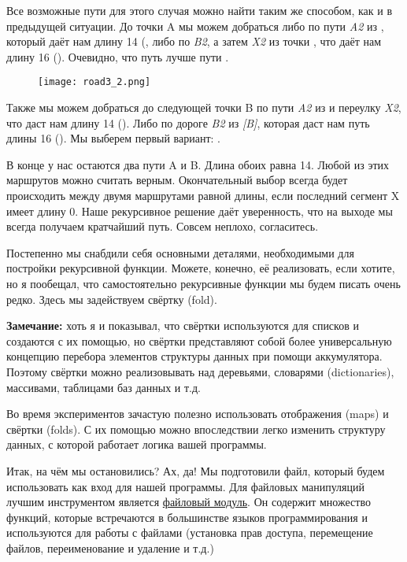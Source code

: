 Все возможные пути для этого случая можно найти таким же способом, как и в предыдущей ситуации.
До точки A мы можем добраться либо по пути \emph{A2} из \ops{[B, X]}, который даёт нам длину 14 (, либо по \emph{B2}, а затем \emph{X2} из точки \ops{[B]}, что даёт нам длину 16 ().
Очевидно, что путь \ops{[B, X, A]} лучше пути \ops{[B, B, X]}.
\begin{figure}[h!]
    \centering
    \texttt{[image: road3\_2.png]}
\end{figure}

Также мы можем добраться до следующей точки B по пути \emph{A2} из \ops{[B, X]} и переулку \emph{X2}, что даст нам длину 14 ().
Либо по дороге \emph{B2} из \emph{[B]}, которая даст нам путь длины 16 ().
Мы выберем первый вариант: \ops{[B, X, A, X]}.

В конце у нас остаются два пути A и B.
Длина обоих равна 14.
Любой из этих маршрутов можно считать верным.
Окончательный  выбор всегда будет происходить между двумя маршрутами равной длины, если последний сегмент X имеет длину 0.
Наше рекурсивное решение даёт уверенность, что на выходе мы всегда получаем кратчайший путь.
Совсем неплохо, согласитесь.

Постепенно мы снабдили себя основными деталями, необходимыми для постройки рекурсивной функции.
Можете, конечно, её реализовать, если хотите, но я пообещал, что самостоятельно рекурсивные функции мы будем писать очень редко.
Здесь мы задействуем свёртку (fold).\\
\colorbox{lgray}
{
\begin{minipage}{1.0\linewidth}
    \textbf{Замечание:} хоть я и показывал, что свёртки используются для списков и создаются с их помощью, но свёртки представляют собой более универсальную концепцию перебора элементов структуры данных при помощи аккумулятора.
Поэтому свёртки можно реализовывать над деревьями, словарями (dictionaries), массивами, таблицами баз данных и т.д.

Во время экспериментов зачастую полезно использовать отображения (maps) и свёртки (folds).
С их помощью можно впоследствии легко изменить структуру данных, с которой работает логика вашей программы.
\end{minipage}
}

Итак, на чём мы остановились?
Ах, да!
Мы подготовили файл, который будем использовать как вход для нашей программы.
Для файловых манипуляций лучшим инструментом является \href{http://erldocs.com/R15B/kernel/file.html}{файловый модуль}.
Он содержит множество функций, которые встречаются в большинстве языков программирования и используются для работы с файлами (установка прав доступа, перемещение файлов, переименование и удаление и т.д.)

